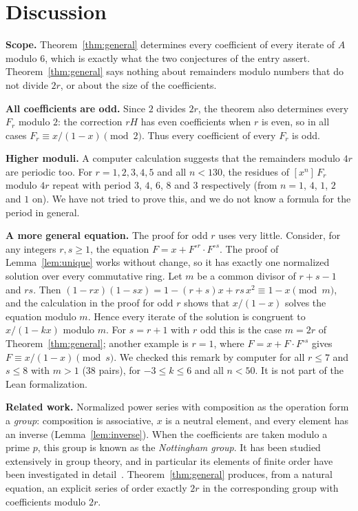 \documentclass[11pt,a4paper]{article}
\theoremstyle{definition}
\theoremstyle{remark}
\newcommand{\coeff}[2]{[x^{#1}]\,#2}
\newcommand{\para}[1]{\par\medskip\noindent\textbf{#1}\enspace}
\begin{document}
\section{Discussion}\label{sec:discussion}

\para{Scope.} Theorem~\ref{thm:general} determines every coefficient of every iterate of $A$ modulo $6$, which is
exactly what the two conjectures of the entry assert. Theorem~\ref{thm:general} says nothing about remainders modulo numbers that do
not divide $2r$, or about the size of the coefficients.

\para{All coefficients are odd.} Since $2$ divides $2r$, the theorem also determines every $F_r$ modulo $2$: the
correction $rH$ has even coefficients when $r$ is even, so in all cases $F_r\equiv x/(1-x)\pmod2$. Thus every
coefficient of every $F_r$ is odd.

\para{Higher moduli.} A computer calculation suggests that the remainders modulo $4r$ are periodic too. For $r=1,2,3,4,5$
and all $n<130$, the residues of $\coeff{n}{F_r}$ modulo $4r$ repeat with period $3$, $4$, $6$, $8$ and $3$
respectively (from $n=1$, $4$, $1$, $2$ and $1$ on). We have not tried to prove this, and we do not know a formula for
the period in general.

\para{A more general equation.} The proof for odd $r$ uses very little. Consider, for any integers $r,s\ge1$, the
equation $F=x+F^{\circ r}\cdot F^{\circ s}$. The proof of Lemma~\ref{lem:unique} works without change, so it has exactly
one normalized solution over every commutative ring. Let $m$ be a common divisor of $r+s-1$ and $rs$. Then
$(1-rx)(1-sx)=1-(r+s)x+rs\,x^2\equiv1-x\pmod m$, and the calculation in the proof for odd $r$ shows that
$x/(1-x)$ solves the equation modulo $m$. Hence every iterate of the solution is congruent to $x/(1-kx)$ modulo $m$.
For $s=r+1$ with $r$ odd this is the case $m=2r$ of Theorem~\ref{thm:general}; another example is $r=1$, where
$F=x+F\cdot F^{\circ s}$ gives $F\equiv x/(1-x)\pmod s$. We checked this remark by computer for all $r\le7$ and
$s\le8$ with $m>1$ ($38$ pairs), for $-3\le k\le6$ and all $n<50$. It is not part of the Lean formalization.

\para{Related work.} Normalized power series with composition as the operation form a \emph{group}: composition is
associative, $x$ is a neutral element, and every element has an inverse (Lemma~\ref{lem:inverse}). When the
coefficients are taken modulo a prime $p$, this group is known as the \emph{Nottingham group}. It has been studied
extensively in group theory, and in particular its elements of finite order have been investigated in
detail~\cite{camina}. Theorem~\ref{thm:general} produces, from a natural equation, an explicit series of order exactly
$2r$ in the corresponding group with coefficients modulo $2r$.
\end{document}
